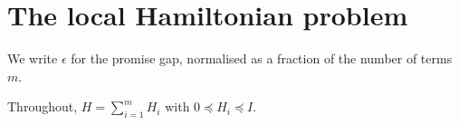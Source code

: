 \section{The local Hamiltonian problem}

We write $\epsilon$ for the promise gap, normalised as a fraction of the number of terms $m$.

Throughout, $H = \sum_{i=1}^m H_i$ with $0 \preceq H_i \preceq I$.
